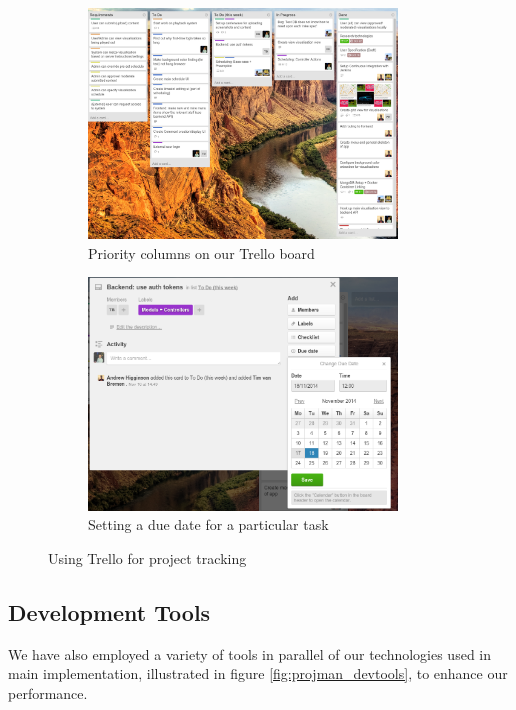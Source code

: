 \documentclass[a4paper, titlepage]{article}
\begin{document}
\begin{figure}[ht]
  \begin{subfigure}{0.5\textwidth}
    \centering
    \includegraphics[width = 0.9\textwidth]{./eval/trello-columns.png}
    \caption{Priority columns on our Trello board}
  \end{subfigure}
  \begin{subfigure}{0.5\textwidth}
    \centering
    \includegraphics[width = 0.9\textwidth]{./eval/trello-due-date.png}
    \caption{Setting a due date for a particular task}
  \end{subfigure}
  \caption{Using Trello for project tracking}
  \label{fig:eval_trello}
\end{figure}

\subsection{Development Tools}
We have also employed a variety of tools in parallel of our technologies used
in main implementation, illustrated in figure \ref{fig:projman_devtools}, to
enhance our performance.
\end{document}
